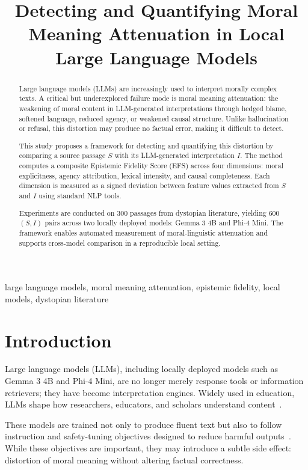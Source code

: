 \documentclass[10pt, conference]{IEEEtran}
\title{Detecting and Quantifying Moral Meaning Attenuation in Local Large Language Models}
\author{
    \IEEEauthorblockN{Perla Imad, Leen Harfoush, Tarek Kronfol}
    \IEEEauthorblockA{
        Department of Mathematics and Computer Science \\
        Lebanese American University \\
        \href{mailto:perla.imad@lau.edu}{perla.imad@lau.edu},
        \href{mailto:leen.harfoush@lau.edu}{leen.harfoush@lau.edu},
        \href{mailto:tarek.kronfol@lau.edu}{tarek.kronfol@lau.edu}
    }
}
\begin{document}
\maketitle

\begin{abstract}
Large language models (LLMs) are increasingly used to interpret morally complex texts. A critical but underexplored failure mode is moral meaning attenuation: the weakening of moral content in LLM-generated interpretations through hedged blame, softened language, reduced agency, or weakened causal structure. Unlike hallucination or refusal, this distortion may produce no factual error, making it difficult to detect.

This study proposes a framework for detecting and quantifying this distortion by comparing a source passage $S$ with its LLM-generated interpretation $I$. The method computes a composite Epistemic Fidelity Score (EFS) across four dimensions: moral explicitness, agency attribution, lexical intensity, and causal completeness. Each dimension is measured as a signed deviation between feature values extracted from $S$ and $I$ using standard NLP tools.

Experiments are conducted on 300 passages from dystopian literature, yielding 600 $(S, I)$ pairs across two locally deployed models: Gemma 3 4B and Phi-4 Mini. The framework enables automated measurement of moral-linguistic attenuation and supports cross-model comparison in a reproducible local setting.
\end{abstract}

\begin{IEEEkeywords}
large language models, moral meaning attenuation, epistemic fidelity, local models, dystopian literature
\end{IEEEkeywords}

\section{Introduction} \label{Intro}

Large language models (LLMs), including locally deployed models such as Gemma 3 4B and Phi-4 Mini, are no longer merely response tools or information retrievers; they have become interpretation engines. Widely used in education, LLMs shape how researchers, educators, and scholars understand content~\cite{vieriu2025education, rodriguez2026ai}.

These models are trained not only to produce fluent text but also to follow instruction and safety-tuning objectives designed to reduce harmful outputs~\cite{openai2025policies}. While these objectives are important, they may introduce a subtle side effect: distortion of moral meaning without altering factual correctness.
\end{document}
